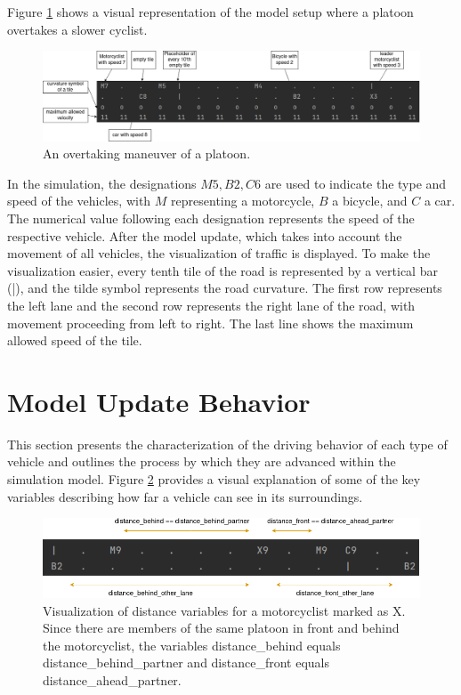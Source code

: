 Figure \ref{fig:overtaking} shows a visual representation of the model setup where a platoon overtakes a slower cyclist. 

\begin{figure}[h]
    \includegraphics[width=1.0\linewidth]{images/overtaking.png}
    \caption{An overtaking maneuver of a platoon.}
    \label{fig:overtaking}
\end{figure}

In the simulation, the designations $M5, B2, C6$ are used to indicate the type and speed of the vehicles, with $M$ representing a motorcycle, $B$ a bicycle, and $C$ a car. The numerical value following each designation represents the speed of the respective vehicle. After the model update, which takes into account the movement of all vehicles, the visualization of traffic is displayed. To make the visualization easier, every tenth tile of the road is represented by a vertical bar (|), and the tilde symbol represents the road curvature. The first row represents the left lane and the second row represents the right lane of the road, with movement proceeding from left to right. The last line shows the maximum allowed speed of the tile.


 \section{Model Update Behavior}
 \label{sec:Model Update Behaviour}
This section presents the characterization of the driving behavior of each type of vehicle and outlines the process by which they are advanced within the simulation model. Figure \ref{fig:distanceExplained} provides a visual explanation of some of the key variables describing how far a vehicle can see in its surroundings.

\begin{figure}[h]
	\includegraphics[width=1.0\linewidth]{images/distanceExplained.png}
	\caption{Visualization of distance variables for a motorcyclist marked as X. Since there are members of the same platoon in front and behind the motorcyclist, the variables distance\_behind equals distance\_behind\_partner and distance\_front equals distance\_ahead\_partner.}
	\label{fig:distanceExplained}
\end{figure}


